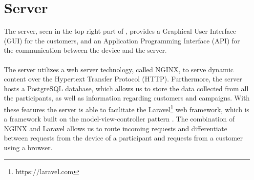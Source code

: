 \section{Server}
\label{sec:server}
The server, seen in the top right part of , provides a Graphical User Interface (GUI) for the customers, and an Application Programming Interface (API) for the communication between the device and the server.
\\\\
The server utilizes a web server technology, called NGINX, to serve dynamic content over the Hypertext Transfer Protocol (HTTP). Furthermore, the server hosts a PostgreSQL database, which allows us to store the data collected from all the participants, as well as information regarding customers and campaigns. With these features the server is able to facilitate the Laravel\footnote{https://laravel.com} web framework, which is a framework built on the model-view-controller pattern \parencite{leff2001web}. The combination of NGINX and Laravel allows us to route incoming requests and differentiate between requests from the device of a participant and requests from a customer using a browser. 






